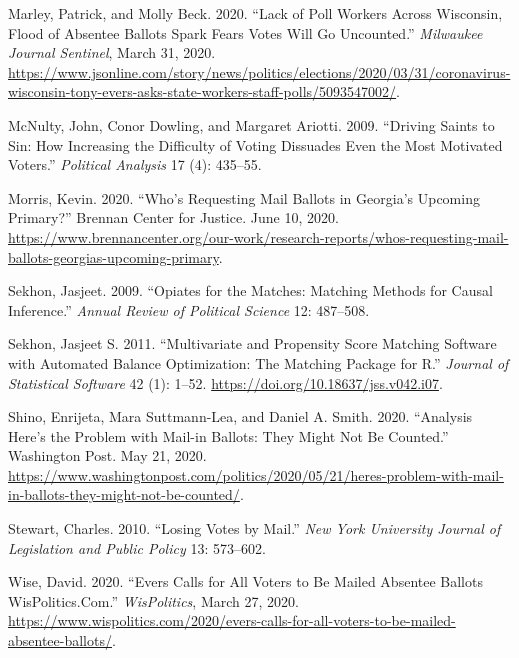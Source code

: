 \documentclass[
  12pt,
]{article}
\newlength{\cslhangindent}
\newenvironment{cslreferences}%
  {\setlength{\parindent}{0pt}%
  \everypar{\setlength{\hangindent}{\cslhangindent}}\ignorespaces}%
  {\par}
\begin{document}
\begin{cslreferences}
\leavevmode\hypertarget{ref-Marley2020}{}%
Marley, Patrick, and Molly Beck. 2020. ``Lack of Poll Workers Across Wisconsin, Flood of Absentee Ballots Spark Fears Votes Will Go Uncounted.'' \emph{Milwaukee Journal Sentinel}, March 31, 2020. \url{https://www.jsonline.com/story/news/politics/elections/2020/03/31/coronavirus-wisconsin-tony-evers-asks-state-workers-staff-polls/5093547002/}.

\leavevmode\hypertarget{ref-McNulty2009}{}%
McNulty, John, Conor Dowling, and Margaret Ariotti. 2009. ``Driving Saints to Sin: How Increasing the Difficulty of Voting Dissuades Even the Most Motivated Voters.'' \emph{Political Analysis} 17 (4): 435--55.

\leavevmode\hypertarget{ref-Morris2020}{}%
Morris, Kevin. 2020. ``Who's Requesting Mail Ballots in Georgia's Upcoming Primary?'' Brennan Center for Justice. June 10, 2020. \url{https://www.brennancenter.org/our-work/research-reports/whos-requesting-mail-ballots-georgias-upcoming-primary}.

\leavevmode\hypertarget{ref-Sekhon2009}{}%
Sekhon, Jasjeet. 2009. ``Opiates for the Matches: Matching Methods for Causal Inference.'' \emph{Annual Review of Political Science} 12: 487--508.

\leavevmode\hypertarget{ref-Sekhon2011}{}%
Sekhon, Jasjeet S. 2011. ``Multivariate and Propensity Score Matching Software with Automated Balance Optimization: The Matching Package for R.'' \emph{Journal of Statistical Software} 42 (1): 1--52. \url{https://doi.org/10.18637/jss.v042.i07}.

\leavevmode\hypertarget{ref-Shino2020}{}%
Shino, Enrijeta, Mara Suttmann-Lea, and Daniel A. Smith. 2020. ``Analysis \textbar{} Here's the Problem with Mail-in Ballots: They Might Not Be Counted.'' Washington Post. May 21, 2020. \url{https://www.washingtonpost.com/politics/2020/05/21/heres-problem-with-mail-in-ballots-they-might-not-be-counted/}.

\leavevmode\hypertarget{ref-Stewart2010}{}%
Stewart, Charles. 2010. ``Losing Votes by Mail.'' \emph{New York University Journal of Legislation and Public Policy} 13: 573--602.

\leavevmode\hypertarget{ref-Wise2020}{}%
Wise, David. 2020. ``Evers Calls for All Voters to Be Mailed Absentee Ballots \textbar{} WisPolitics.Com.'' \emph{WisPolitics}, March 27, 2020. \url{https://www.wispolitics.com/2020/evers-calls-for-all-voters-to-be-mailed-absentee-ballots/}.
\end{cslreferences}
\end{document}
